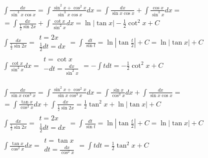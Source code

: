 
\begin{gather*}\int \frac{dx}{\sin^3 x \cos x} = \int \frac{\sin^2 x+\cos^2 x}{\sin^3 x \cos x}dx = \int \frac{dx}{\sin x\cos x}+\int \frac{\cos x}{\sin^3 x}dx =  \\
= \int \frac{dx}{\frac{1}{2}\sin 2x}+\int \frac{\cot x}{\sin^2 x}dx = \ln|\tan x|-\frac{1}{2}\cot^2 x + C \\
\int \frac{dx}{\frac{1}{2}\sin 2x} = \begin{array}{|l|} t=2x \\ \frac{1}{2}dt=dx \end{array} = \int \frac{dt}{\sin t} = \ln|\tan \frac{t}{2}|+C = \ln|\tan x|+C \\
\int \frac{\cot x}{\sin^2 x}dx = \begin{array}{|l|} t=\cot x \\ -dt=\frac{dx}{\sin^2 x} \end{array} = -\int t dt = -\frac{1}{2}\cot^2 x + C\end{gather*}



\begin{gather*}\int \frac{dx}{\sin x \cos^3 x} = \int \frac{\sin^2 x+\cos^2 x}{\sin x\cos^3 x}dx = \int \frac{\sin x}{\cos^3 x}dx + \int \frac{dx}{\sin x\cos x}=  \\
= \int \frac{\tan x}{\cos^2 x}dx+\int \frac{dx}{\frac{1}{2}\sin 2x} = \frac{1}{2}\tan^2 x +\ln|\tan x|+ C \\
\int \frac{dx}{\frac{1}{2}\sin 2x} = \begin{array}{|l|} t=2x \\ \frac{1}{2}dt=dx \end{array} = \int \frac{dt}{\sin t} = \ln|\tan \frac{t}{2}|+C = \ln|\tan x|+C \\
\int \frac{\tan x}{\cos^2 x}dx = \begin{array}{|l|} t=\tan x \\ dt=\frac{dx}{\cos^2 x} \end{array} = \int t dt = \frac{1}{2}\tan^2 x + C\end{gather*}



